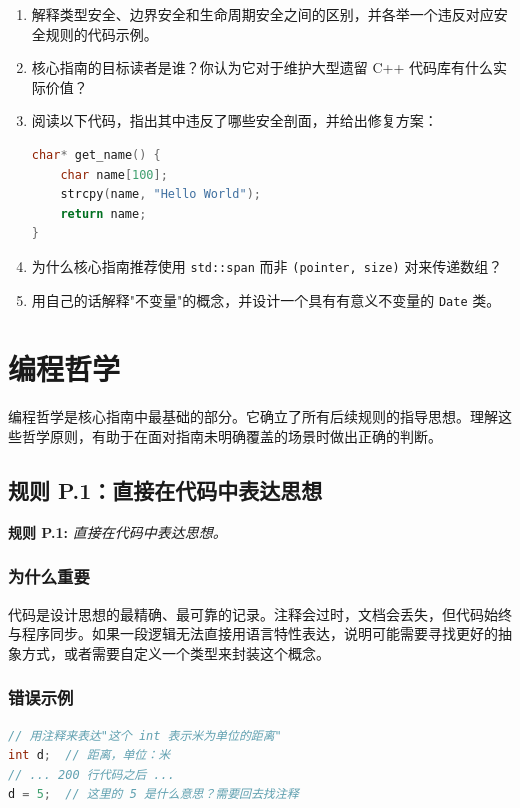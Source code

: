 \begin{enumerate}
  \item 解释类型安全、边界安全和生命周期安全之间的区别，并各举一个违反对应安全规则的代码示例。
  \item 核心指南的目标读者是谁？你认为它对于维护大型遗留 C++ 代码库有什么实际价值？
  \item 阅读以下代码，指出其中违反了哪些安全剖面，并给出修复方案：
\begin{lstlisting}[language=C++]
char* get_name() {
    char name[100];
    strcpy(name, "Hello World");
    return name;
}
\end{lstlisting}
  \item 为什么核心指南推荐使用 \texttt{std::span} 而非 \texttt{(pointer, size)} 对来传递数组？
  \item 用自己的话解释"不变量"的概念，并设计一个具有有意义不变量的 \texttt{Date} 类。
\end{enumerate}


\chapter{编程哲学}

编程哲学是核心指南中最基础的部分。它确立了所有后续规则的指导思想。理解这些哲学原则，有助于在面对指南未明确覆盖的场景时做出正确的判断。

\section{规则 P.1：直接在代码中表达思想}

\textbf{规则 P.1:} \textit{直接在代码中表达思想。}

\subsection{为什么重要}

代码是设计思想的最精确、最可靠的记录。注释会过时，文档会丢失，但代码始终与程序同步。如果一段逻辑无法直接用语言特性表达，说明可能需要寻找更好的抽象方式，或者需要自定义一个类型来封装这个概念。

\subsection{错误示例}

\begin{lstlisting}[language=C++]
// 用注释来表达"这个 int 表示米为单位的距离"
int d;  // 距离，单位：米
// ... 200 行代码之后 ...
d = 5;  // 这里的 5 是什么意思？需要回去找注释
\end{lstlisting}

